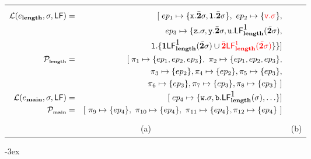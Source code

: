 \documentclass[9pt]{sigplanconf}
\newcommand{\cred}[1]{{\color{red}{#1}}}
\begin{document}
\begin{figure*}[t!]
\begin{tabular}{cc}
\begin{minipage}{.51\textwidth}
        \small
\begin{eqnarray*}
        \mathcal{L}(e_{\length},\sigma,\Lfonly) &=&
              [\;ep_1 \mapsto \lbrace \px.\cbar \sigma,
\xl.\cbar\sigma\rbrace ,~ep_2 \mapsto \lbrace \cred{
\pv.\sigma}  \rbrace,\\
 &&          \;\;  ep_3 \mapsto \lbrace \pz.\sigma,
                \py.\cbar\sigma,
\pu.\Lf{\length}{\mbox{1}}{\cbar\sigma},\\
&&            \;\;\;\;\;\;\;\;\;\;\;\;\;\;\;\;\; 
\xl.\{ \acdr\Lf{\length}{\mbox{1}}{\cbar\sigma} \cup 
\cred{\cbar\Lf{\length}{1}{\cbar\sigma}}\}\}
             \rbrack \\
            \cal{P_{\mbox{\tiny \length}}} &=&
                [\;\pi_1 \mapsto \lbrace ep_1, ep_2, ep_3 \rbrace,  \
                 \pi_2 \mapsto \lbrace ep_1, ep_2, ep_3
                  \rbrace, \\
&&\;\;  \pi_3 \mapsto \lbrace ep_2
                  \rbrace ,  \pi_4 \mapsto \lbrace ep_2
                  \rbrace, \pi_5 \mapsto \lbrace  ep_3 \rbrace, \\
 &&  \;\;                        \pi_6 \mapsto \lbrace ep_3 \rbrace,
\pi_7 \mapsto
                   \lbrace ep_3\rbrace, \pi_8 \mapsto \lbrace ep_3
\rbrace~\rbrack\\
              \mathcal{L}(e_{\main},\sigma,\Lfonly) &=&
                [\;
                  ep_4 \mapsto \lbrace \pw.\sigma,
           \pb.\Lf{\length}{\mbox{1}}{\sigma}, \ldots\rbrace
                   ] \\
               \cal{P_{\mbox{\tiny \main}}} &=&
                   \lbrack~\pi_9 \mapsto \lbrace ep_4 \rbrace,  \
                    \pi_{10} \mapsto \lbrace ep_4 \rbrace,  \
                   \pi_{11} \mapsto \lbrace ep_4 \rbrace,  \pi_{12} \mapsto \lbrace ep_4 \rbrace~\rbrack
\end{eqnarray*}
    \end{minipage} \\
(a)&
(b)
  \end{tabular}
\kern -3ex
\caption{(a) Example program and (b) its liveness
maps.}\label{fig:mot-example2}
\end{figure*}
\end{document}
